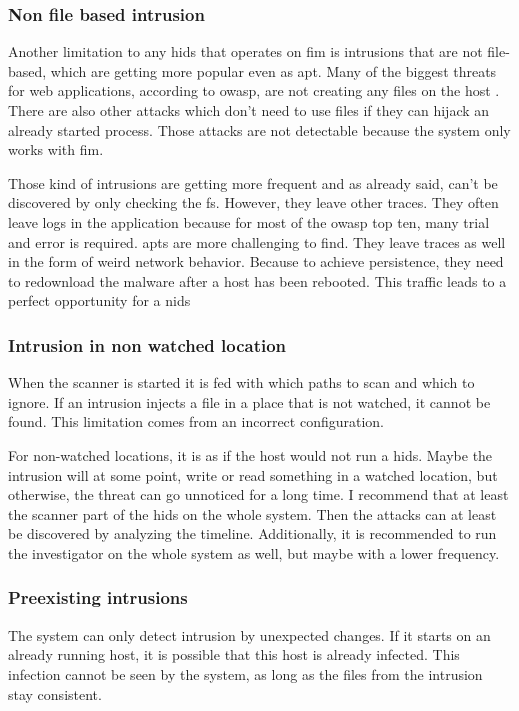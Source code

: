 \subsubsection{Non file based intrusion}
\label{sec:limitation:nonFileBased}
Another limitation to any \gls{hids} that operates on \gls{fim} is intrusions that are not file-based, which are getting more popular even as \gls{apt}. Many of the biggest threats for web applications, according to \gls{owasp}, are not creating any files on the host \cite{owasp}. There are also other attacks which don't need to use files if they can hijack an already started process. Those attacks are not detectable because the system only works with \gls{fim}.

Those kind of intrusions are getting more frequent and as already said, can't be discovered by only checking the \gls{fs}. However, they leave other traces. They often leave logs in the application because for most of the \gls{owasp} top ten, many trial and error is required. \gls{apt}s are more challenging to find. They leave traces as well in the form of weird network behavior. Because to achieve persistence, they need to redownload the malware after a host has been rebooted. This traffic leads to a perfect opportunity for a \gls{nids}

\subsubsection{Intrusion in non watched location}
\label{sec:limitation:nonWatched}
When the scanner is started it is fed with which paths to scan and which to ignore. If an intrusion injects a file in a place that is not watched, it cannot be found. This limitation comes from an incorrect configuration.

For non-watched locations, it is as if the host would not run a \gls{hids}. Maybe the intrusion will at some point, write or read something in a watched location, but otherwise, the threat can go unnoticed for a long time. I recommend that at least the scanner part of the \gls{hids} on the whole system. Then the attacks can at least be discovered by analyzing the timeline. Additionally, it is recommended to run the investigator on the whole system as well, but maybe with a lower frequency.

\subsubsection{Preexisting intrusions}
\label{sec:limitation:preexisting}
The system can only detect intrusion by unexpected changes. If it starts on an already running host, it is possible that this host is already infected. This infection cannot be seen by the system, as long as the files from the intrusion stay consistent. 

